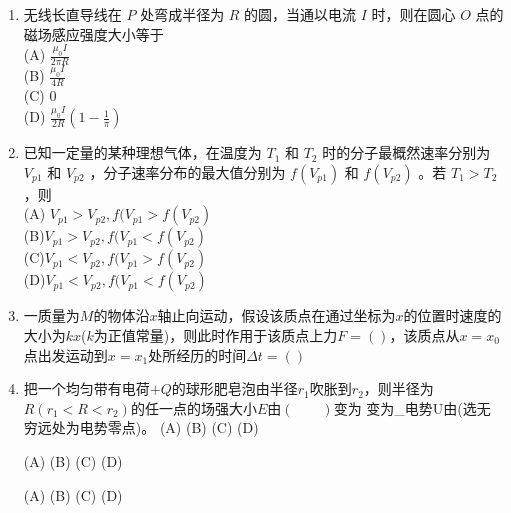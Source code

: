 \begin{enumerate}
(D)$\displaystyle E=0,\qquad U=\frac{Q}{4 \pi \varepsilon_0 R_2}$
\item 无线长直导线在 $P$ 处弯成半径为 $R$ 的圆，当通以电流 $I$ 时，则在圆心  $O$ 点的磁场感应强度大小等于\\
(A) $\displaystyle \frac{\mu_0 I}{2 \pi R}$\\
(B) $\displaystyle \frac{\mu_0 I}{4R}$\\
(C) $0$\\
(D) $\displaystyle \frac{\mu_0 I}{2R}(1-\frac{1}{\pi})$
\item 已知一定量的某种理想气体，在温度为 $T_1$ 和 $T_2$ 时的分子最概然速率分别为 $V_{p1}$ 和 $V_{p2}$ ，分子速率分布的最大值分别为 $f(V_{p1})$ 和 $f(V_{p2})$ 。若 $T_1>T_2$ ，则\\
(A) $V_{p1}>V_{p2},f(V_{p1}>f(V_{p2})$\\
(B)$V_{p1}>V_{p2},f(V_{p1}<f(V_{p2})$\\
(C)$V_{p1}<V_{p2},f(V_{p1}>f(V_{p2})$\\
(D)$V_{p1}<V_{p2},f(V_{p1}<f(V_{p2})$\\
\item 一质量为$M$的物体沿$x$轴止向运动，假设该质点在通过坐标为$x$的位置时速度的大小为$kx$($k$为正值常量)，则此时作用于该质点上力$F=()$，该质点从$x=x_0$点出发运动到$x=x_1$处所经历的时间$\Delta t=()$\\
\item 把一个均匀带有电荷$+Q$的球形肥皂泡由半径$r_1$吹胀到$r_2$，则半径为$R(r_1<R<r_2)$的任一点的场强大小$E$由$(\qquad)$变为
变为_电势U由(选无穷远处为电势零点)。
(A)
(B)
(C)
(D)


(A)
(B)
(C)
(D)

(A)
(B)
(C)
(D)
\end{enumerate}

